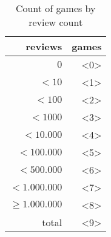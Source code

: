\begin{table}[h]
    \centering
    \begin{tabular}{r|r}
reviews             & games \\\hline
    $0$             & <0>\\
    $< 10$          & <1>\\
    $< 100$         & <2>\\
    $< 1000$        & <3>\\
    $< 10.000$      & <4>\\
    $< 100.000$     & <5>\\
    $< 500.000$     & <6>\\
    $< 1.000.000$   & <7>\\
    $\geq1.000.000$ & <8>\\\hline
    total           & <9>
\end{tabular}
    \caption{Count of games by review count}
    \label{tab:game_metrics}
\end{table}
